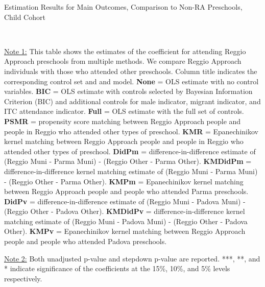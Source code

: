 \begin{table}[H] \caption{Estimation Results for Main Outcomes, Comparison to Non-RA Preschools, Child Cohort} \label{ols-M-child-reg-pres}
\scalebox{0.59}{}
\vspace{1ex} \\
\footnotesize\raggedright{\underline{Note 1:} This table shows the estimates of the coefficient for attending Reggio Approach preschools from multiple methods. We compare Reggio Approach individuals with those who attended other preschools. Column title indicates the corresponding control set and and model. \textbf{None} = OLS estimate with no control variables. \textbf{BIC} = OLS estimate with controls selected by Bayesian Information Criterion (BIC) and additional controls for male indicator, migrant indicator, and ITC attendance indicator. \textbf{Full} = OLS estimate with the full set of controls. \textbf{PSMR} =  propensity score matching between Reggio Approach people and people in Reggio who attended other types of preschool. \textbf{KMR} = Epanechinikov kernel matching between Reggio Approach people and people in Reggio who attended other types of preschool. \textbf{DidPm} = difference-in-difference estimate of (Reggio Muni - Parma Muni) - (Reggio Other - Parma Other). \textbf{KMDidPm} = difference-in-difference kernel matching estimate of (Reggio Muni - Parma Muni) - (Reggio Other - Parma Other).   \textbf{KMPm} = Epanechinikov kernel matching between Reggio Approach people and people who attended Parma preschools. \textbf{DidPv} = difference-in-difference estimate of (Reggio Muni - Padova Muni) - (Reggio Other - Padova Other). \textbf{KMDidPv} = difference-in-difference kernel matching estimate of (Reggio Muni - Padova Muni) - (Reggio Other - Padova Other).  \textbf{KMPv} = Epanechinikov kernel matching between Reggio Approach people and people who attended Padova preschools.}

\footnotesize\raggedright{\underline{Note 2:} Both unadjusted p-value and stepdown p-value are reported. ***, **, and * indicate significance of the coefficients at the 15\%, 10\%, and 5\% levels respectively.}

\end{table}

